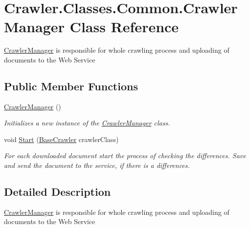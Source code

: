 \hypertarget{class_crawler_1_1_classes_1_1_common_1_1_crawler_manager}{\section{Crawler.\-Classes.\-Common.\-Crawler\-Manager Class Reference}
\label{class_crawler_1_1_classes_1_1_common_1_1_crawler_manager}
}


\hyperlink{class_crawler_1_1_classes_1_1_common_1_1_crawler_manager}{Crawler\-Manager} is responsible for whole crawling process and uploading of documents to the Web Service  


\subsection*{Public Member Functions}
\begin{DoxyCompactItemize}
\item 
\hyperlink{class_crawler_1_1_classes_1_1_common_1_1_crawler_manager_a4021656baa029c0f7edbeff04a9b53e5}{Crawler\-Manager} ()
\begin{DoxyCompactList}\small\item\em Initializes a new instance of the \hyperlink{class_crawler_1_1_classes_1_1_common_1_1_crawler_manager}{Crawler\-Manager} class. \end{DoxyCompactList}\item 
void \hyperlink{class_crawler_1_1_classes_1_1_common_1_1_crawler_manager_a4591e217c8121f2c4968585df6619fc7}{Start} (\hyperlink{class_crawler_1_1_classes_1_1_common_1_1_base_crawler}{Base\-Crawler} crawler\-Class)
\begin{DoxyCompactList}\small\item\em For each downloaded document start the process of checking the differences. Save and send the document to the service, if there is a differences. \end{DoxyCompactList}\end{DoxyCompactItemize}


\subsection{Detailed Description}
\hyperlink{class_crawler_1_1_classes_1_1_common_1_1_crawler_manager}{Crawler\-Manager} is responsible for whole crawling process and uploading of documents to the Web Service 



